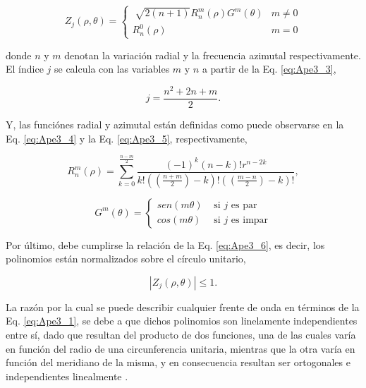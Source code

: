 \begin{equation}\label{eq:Ape3_2}
 Z_{j}(\rho,\theta)= \left \{ \begin{matrix} \sqrt[]{2(n+1)} R_{n}^{m}(\rho)G^{m}(\theta) & m \neq 0
\\ R_{n}^{0}(\rho) & m = 0 \end{matrix}\right. 
\end{equation}

donde $n$ y $m$ denotan la variación radial y la frecuencia azimutal respectivamente. El índice $j$ se calcula con las variables $m$ y $n$ a partir de la Eq. \ref{eq:Ape3_3},

\begin{equation}\label{eq:Ape3_3}
 j=\frac{n^{2}+2n+m}{2}.
\end{equation}

Y, las funciónes radial y azimutal están definidas como puede observarse en la Eq. \ref{eq:Ape3_4} y la Eq. \ref{eq:Ape3_5}, respectivamente,
 
\begin{equation}\label{eq:Ape3_4}
 R_{n}^{m} (\rho)= \sum_{k=0}^{\frac{n-m}{2}} \frac{(-1)^{k}(n-k)!r^{n-2k}}{k!((\frac{n+m}{2})-k)!((\frac{m-n}{2})-k)!},
\end{equation}

\begin{equation}\label{eq:Ape3_5}
 G^{m}(\theta)= \left \{ \begin{matrix} sen(m\theta) & \mbox{ si } j \mbox{ es par}
\\ cos(m\theta) & \mbox{ si } j \mbox{ es impar} \end{matrix}\right. 
\end{equation}

Por último, debe cumplirse la relación de la Eq. \ref{eq:Ape3_6}, es decir, los polinomios están normalizados sobre el círculo unitario,

\begin{equation}\label{eq:Ape3_6}
 |Z_{j}(\rho,\theta)| \leq 1.
\end{equation}

La razón por la cual se puede describir cualquier frente de onda en términos de la Eq. \ref{eq:Ape3_1}, se debe a que dichos polinomios son linelamente independientes entre sí, dado que resultan del producto de dos funciones, una de las cuales varía en función del radio de una circunferencia unitaria, mientras que la otra varía en función del meridiano de la misma, y en consecuencia resultan ser ortogonales e independientes linealmente . 


